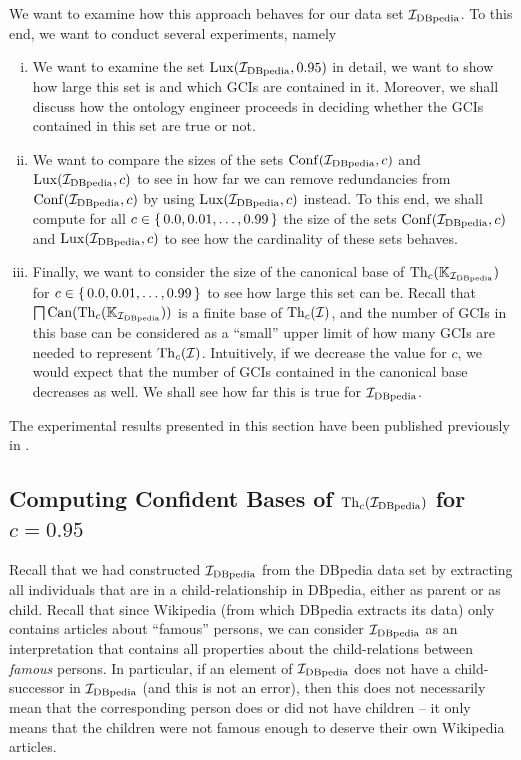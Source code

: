 We want to examine how this approach behaves for our data set ${\mathcal{I}_{\text{DBpedia}}}$.  To this end,
we want to conduct several experiments, namely
\begin{enumerate}[i. ]
\item We want to examine the set $\operatorname{Lux}({\mathcal{I}_{\text{DBpedia}}}, 0.95)$ in detail, \ie we want to show
  how large this set is and which GCIs are contained in it.  Moreover, we shall discuss
  how the ontology engineer proceeds in deciding whether the GCIs contained in this set
  are true or not.
\item We want to compare the sizes of the sets $\operatorname{Conf}({\mathcal{I}_{\text{DBpedia}}}, c)$ and $\operatorname{Lux}({\mathcal{I}_{\text{DBpedia}}},
  c)$ to see in how far we can remove redundancies from $\operatorname{Conf}({\mathcal{I}_{\text{DBpedia}}}, c)$ by using
  $\operatorname{Lux}({\mathcal{I}_{\text{DBpedia}}}, c)$ instead.  To this end, we shall compute for all $c \in {\ensuremath{\{\, 0.0,
    0.01, \dots, 0.99\,\}}}$ the size of the sets $\operatorname{Conf}({\mathcal{I}_{\text{DBpedia}}}, c)$ and $\operatorname{Lux}({\mathcal{I}_{\text{DBpedia}}},
  c)$ to see how the cardinality of these sets behaves.
\item Finally, we want to consider the size of the canonical base of $\operatorname{Th}_c({\mathbb{K}}_{\mathcal{I}_{\text{DBpedia}}})$ for $c \in {\ensuremath{\{\, 0.0, 0.01, \dots, 0.99 \,\}}}$ to see how large this set can
  be.  Recall that $\bigsqcap \operatorname{Can}(\operatorname{Th}_c({\mathbb{K}}_{\mathcal{I}_{\text{DBpedia}}}))$ is a finite base of
  $\operatorname{Th}_c(\mathcal{I})$, and the number of GCIs in this base can be considered as a
  ``small'' upper limit of how many GCIs are needed to represent $\operatorname{Th}_c(\mathcal{I})$.
  Intuitively, if we decrease the value for $c$, we would expect that the number of GCIs
  contained in the canonical base decreases as well.  We shall see how far this is true
  for ${\mathcal{I}_{\text{DBpedia}}}$.
\end{enumerate}

The experimental results presented in this section have been published previously in
\cite{Borchmann-LTCS-12-06}.

\subsection{Computing Confident Bases of $\operatorname{Th}_c({\mathcal{I}_{\text{DBpedia}}})$ for $c = 0.95$}
\label{sec:comp-conf-bases}

Recall that we had constructed ${\mathcal{I}_{\text{DBpedia}}}$ from the DBpedia data set by extracting all
individuals that are in a \textsf{child}-relationship in DBpedia, either as parent or as
child.  Recall that since Wikipedia (from which DBpedia extracts its data) only contains
articles about \enquote{famous} persons, we can consider ${\mathcal{I}_{\text{DBpedia}}}$ as an interpretation
that contains all properties about the child-relations between \emph{famous} persons.  In
particular, if an element of ${\mathcal{I}_{\text{DBpedia}}}$ does not have a \textsf{child}-successor in
${\mathcal{I}_{\text{DBpedia}}}$ (and this is not an error), then this does not necessarily mean that the
corresponding person does or did not have children -- it only means that the children were
not famous enough to deserve their own Wikipedia articles.

